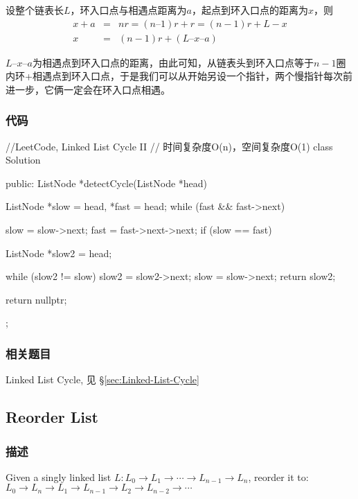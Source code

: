 设整个链表长$L$，环入口点与相遇点距离为$a$，起点到环入口点的距离为$x$，则
\begin{eqnarray}
x + a &=& nr = (n – 1)r +r = (n-1)r + L - x \nonumber \\
x &=& (n-1)r + (L – x – a) \nonumber
\end{eqnarray}

$L – x – a$为相遇点到环入口点的距离，由此可知，从链表头到环入口点等于$n-1$圈内环+相遇点到环入口点，于是我们可以从开始另设一个指针，两个慢指针每次前进一步，它俩一定会在环入口点相遇。


\subsubsection{代码}
\begin{Code}
//LeetCode, Linked List Cycle II
// 时间复杂度O(n)，空间复杂度O(1)
class Solution {
public:
    ListNode *detectCycle(ListNode *head) {
        ListNode *slow = head, *fast = head;
        while (fast && fast->next) {
            slow = slow->next;
            fast = fast->next->next;
            if (slow == fast) {
                ListNode *slow2 = head;

                while (slow2 != slow) {
                    slow2 = slow2->next;
                    slow = slow->next;
                }
                return slow2;
            }
        }
        return nullptr;
    }
};
\end{Code}


\subsubsection{相关题目}
\begindot
\item Linked List Cycle, 见 \S \ref{sec:Linked-List-Cycle}
\myenddot


\subsection{Reorder List}
\label{sec:Reorder-List}


\subsubsection{描述}
Given a singly linked list $L: L_0 \rightarrow L_1 \rightarrow \cdots \rightarrow L_{n-1} \rightarrow L_n$,
reorder it to: $L_0 \rightarrow L_n \rightarrow L_1 \rightarrow L_{n-1} \rightarrow L_2 \rightarrow L_{n-2} \rightarrow \cdots$

